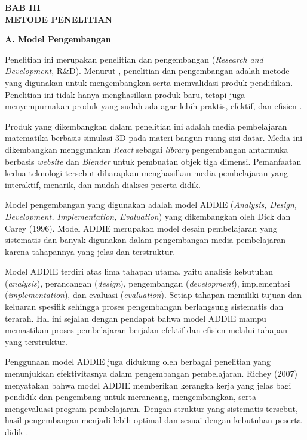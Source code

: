 \newpage
\begin{center}
    \textbf{BAB III}\\
    \textbf{METODE PENELITIAN}
\end{center}

\textbf{A. Model Pengembangan}

\hspace*{1cm}Penelitian ini merupakan penelitian dan pengembangan (\textit{Research and Development}, R\&D). Menurut \cite{borg1989}, penelitian dan pengembangan adalah metode yang digunakan untuk mengembangkan serta memvalidasi produk pendidikan. Penelitian ini tidak hanya menghasilkan produk baru, tetapi juga menyempurnakan produk yang sudah ada agar lebih praktis, efektif, dan efisien \citep{sugiyono2018}.

\hspace*{1cm}Produk yang dikembangkan dalam penelitian ini adalah media pembelajaran matematika berbasis simulasi 3D pada materi bangun ruang sisi datar. Media ini dikembangkan menggunakan \textit{React} sebagai \textit{library} pengembangan antarmuka berbasis \textit{website} dan \textit{Blender} untuk pembuatan objek tiga dimensi. Pemanfaatan kedua teknologi tersebut diharapkan menghasilkan media pembelajaran yang interaktif, menarik, dan mudah diakses peserta didik.

\hspace*{1cm}Model pengembangan yang digunakan adalah model ADDIE (\textit{Analysis, Design, Development, Implementation, Evaluation}) yang dikembangkan oleh Dick dan Carey (1996). Model ADDIE merupakan model desain pembelajaran yang sistematis dan banyak digunakan dalam pengembangan media pembelajaran karena tahapannya yang jelas dan terstruktur.

\hspace*{1cm}Model ADDIE terdiri atas lima tahapan utama, yaitu analisis kebutuhan (\textit{analysis}), perancangan (\textit{design}), pengembangan (\textit{development}), implementasi (\textit{implementation}), dan evaluasi (\textit{evaluation}). Setiap tahapan memiliki tujuan dan keluaran spesifik sehingga proses pengembangan berlangsung sistematis dan terarah. Hal ini sejalan dengan pendapat \cite{gustiani2019} bahwa model ADDIE mampu memastikan proses pembelajaran berjalan efektif dan efisien melalui tahapan yang terstruktur.

\hspace*{1cm}Penggunaan model ADDIE juga didukung oleh berbagai penelitian yang menunjukkan efektivitasnya dalam pengembangan pembelajaran. Richey (2007) menyatakan bahwa model ADDIE memberikan kerangka kerja yang jelas bagi pendidik dan pengembang untuk merancang, mengembangkan, serta mengevaluasi program pembelajaran. Dengan struktur yang sistematis tersebut, hasil pengembangan menjadi lebih optimal dan sesuai dengan kebutuhan peserta didik \citep{richey2007}.\\[1.5em]

